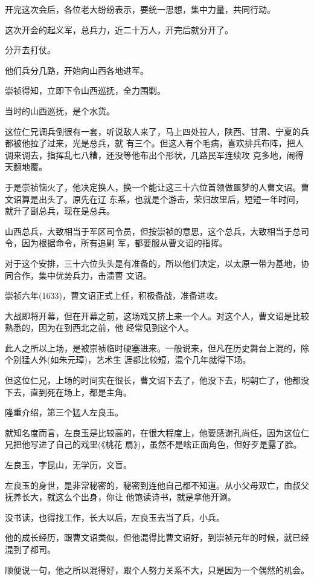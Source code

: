 \documentclass[11pt,a4paper,onecolumn]{article}
\begin{document}
开完这次会后，各位老大纷纷表示，要统一思想，集中力量，共同行动。

这次开会的起义军，总兵力，近二十万人，开完后就分开了。

分开去打仗。

他们兵分几路，开始向山西各地进军。

崇祯得知，立即下令山西巡抚，全力围剿。

当时的山西巡抚，是个水货。

这位仁兄调兵倒很有一套，听说敌人来了，马上四处拉人，陕西、甘肃、宁夏的兵都被他拉了过来，光是总兵，就
有三个。但这人有个毛病，喜欢排兵布阵，把人调来调去，指挥乱七八糟，还没等他布出个形状，几路民军连续攻
克多地，闹得天翻地覆。

于是崇祯恼火了，他决定换人，换一个能让这三十六位首领做噩梦的人\myrule 曹文诏。曹文诏算是出头了。原先在辽
东系，也就是个游击，荣归故里后，短短一年时间，就升了副总兵，现在是总兵。

山西总兵，大致相当于军区司令员，但按崇祯的意思，这个总兵，大致相当于总司令，因为根据命令，所有追剿
军，都要服从曹文诏的指挥。

对于这个安排，三十六位头头是有准备的，所以他们决定，以太原一带为基地，协同合作，集中优势兵力，击溃曹
文诏。

崇祯六年(1633)，曹文诏正式上任，积极备战，准备进攻。

大战即将开幕，但在开幕之前，这场戏又挤上来一个人。对这个人，曹文诏是比较熟悉的，因为在到西北之前，他
经常见到这个人。

此人之所以上场，是被崇祯临时硬塞进来。一般说来，但凡在历史舞台上混的，除个别猛人外(如朱元璋)，艺术生
涯都比较短，混个几年就得下场。

但这位仁兄，上场的时间实在很长，曹文诏下去了，他没下去，明朝亡了，他都没下去，直到死在场上，都是主角。

隆重介绍，第三个猛人\myrule 左良玉。

就知名度而言，左良玉是比较高的，在很大程度上，他要感谢孔尚任，因为这位仁兄把他写进了自己的戏里(《桃花
扇》)，虽然不是啥正面角色，但好歹是露了脸。

左良玉，字昆山，无学历，文盲。

左良玉的身世，是非常秘密的，秘密到连他自己都不知道。从小父母双亡，由叔父抚养长大，就这么个出身，你让
他饱读诗书，就是拿他开涮。

没书读，也得找工作，长大以后，左良玉去当了兵，小兵。

他的成长经历，跟曹文诏类似，但他混得比曹文诏好，到崇祯元年的时候，就已经混到了都司。

顺便说一句，他之所以混得好，跟个人努力关系不大，只是因为一个偶然的机会。
\end{document}
